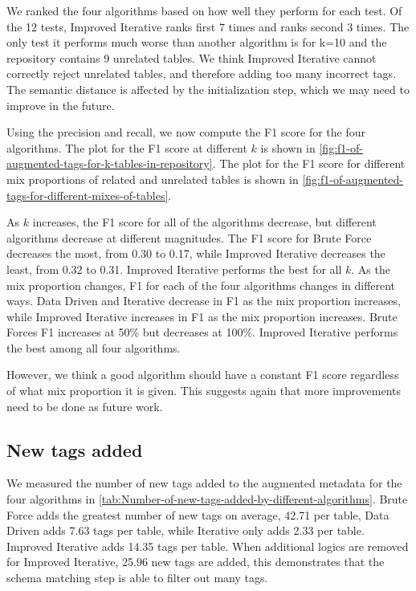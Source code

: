 We ranked the four algorithms based on how well they perform for each test. Of the 12 tests, Improved Iterative ranks first 7 times and ranks second 3 times. The only test it performs much worse than another algorithm is for k=10 and the repository contains 9 unrelated tables. We think Improved Iterative cannot correctly reject unrelated tables, and therefore adding too many incorrect tags. The semantic distance is affected by the initialization step, which we may need to improve in the future.

Using the precision and recall, we now compute the F1 score for the four algorithms. The plot for the F1 score at different $k$ is shown in \autoref{fig:f1-of-augmented-tags-for-k-tables-in-repository}. The plot for the F1 score for different mix proportions of related and unrelated tables is shown in \autoref{fig:f1-of-augmented-tags-for-different-mixes-of-tables}.

As $k$ increases, the F1 score for all of the algorithms decrease, but different algorithms decrease at different magnitudes. The F1 score for Brute Force decreases the most, from 0.30 to 0.17, while Improved Iterative decreases the least, from 0.32 to 0.31. Improved Iterative performs the best for all $k$. As the mix proportion changes, F1 for each of the four algorithms changes in different ways. Data Driven and Iterative decrease in F1 as the mix proportion increases, while Improved Iterative increases in F1 as the mix proportion increases. Brute Forces F1 increases at 50\% but decreases at 100\%. Improved Iterative performs the best among all four algorithms.

However, we think a good algorithm should have a constant F1 score regardless of what mix proportion it is given. This suggests again that more improvements need to be done as future work.

\subsection{New tags added}

We measured the number of new tags added to the augmented metadata for the four algorithms in \autoref{tab:Number-of-new-tags-added-by-different-algorithms}. Brute Force adds the greatest number of new tags on average, 42.71 per table, Data Driven adds 7.63 tags per table, while Iterative only adds 2.33 per table. Improved Iterative adds 14.35 tags per table. When additional logics are removed for Improved Iterative, 25.96 new tags are added, this demonstrates that the schema matching step is able to filter out many tags.

